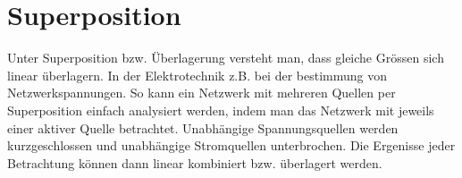 



\section{Superposition}
Unter Superposition bzw. Überlagerung versteht man, dass gleiche Grössen sich linear überlagern.
In der Elektrotechnik z.B. bei der bestimmung von Netzwerkspannungen. 
So kann ein Netzwerk mit mehreren Quellen per Superposition einfach analysiert werden, indem man das Netzwerk mit jeweils einer aktiver Quelle betrachtet. 
Unabhängige Spannungsquellen werden kurzgeschlossen und unabhängige Stromquellen unterbrochen.
Die Ergenisse jeder Betrachtung können dann linear kombiniert bzw. überlagert werden.
